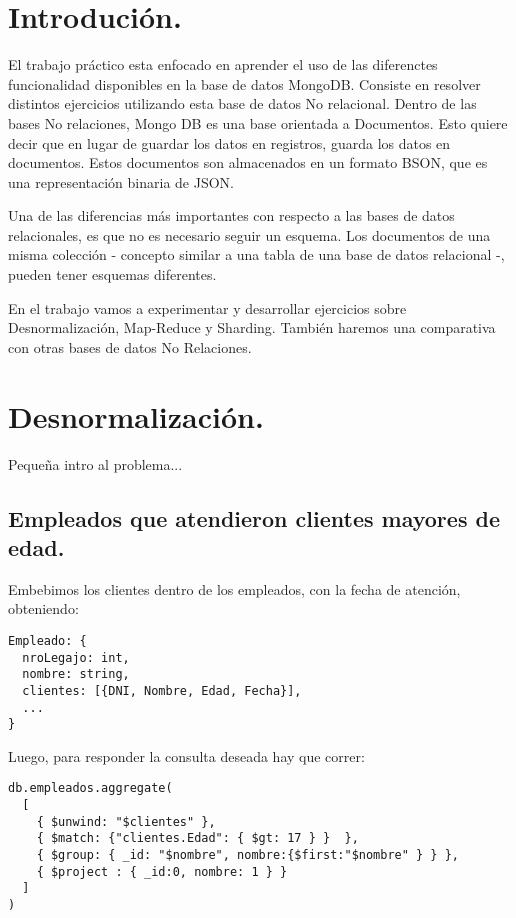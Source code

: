 \section{Introdución.}
El trabajo práctico esta enfocado en aprender el uso de las diferenctes funcionalidad disponibles en la base de datos MongoDB. Consiste en resolver distintos ejercicios utilizando esta base de datos No relacional. Dentro de las bases No relaciones, Mongo DB es una base orientada a Documentos. Esto quiere decir que en lugar de guardar los datos en registros, guarda los datos en documentos. Estos documentos son almacenados en un formato BSON, que es una representación binaria de JSON.
 
Una de las diferencias más importantes con respecto a las bases de datos relacionales, es que no es necesario seguir un esquema. Los documentos de una misma colección - concepto similar a una tabla de una base de datos relacional -, pueden tener esquemas diferentes.

En el trabajo vamos a experimentar y desarrollar ejercicios sobre Desnormalización, Map-Reduce y Sharding. También haremos una comparativa con otras bases de datos No Relaciones.

\section{Desnormalización.}
Pequeña intro al problema...

\subsection{Empleados que atendieron clientes mayores de edad.}

Embebimos los clientes dentro de los empleados, con la fecha de atención, obteniendo:

\begin{lstlisting}
Empleado: {
  nroLegajo: int,
  nombre: string,
  clientes: [{DNI, Nombre, Edad, Fecha}],
  ...
}
\end{lstlisting}

Luego, para responder la consulta deseada hay que correr:

\begin{lstlisting}
db.empleados.aggregate(
  [
    { $unwind: "$clientes" },
    { $match: {"clientes.Edad": { $gt: 17 } }  },
    { $group: { _id: "$nombre", nombre:{$first:"$nombre" } } },
    { $project : { _id:0, nombre: 1 } }
  ]
)
\end{lstlisting}
\label{consulta-a}

